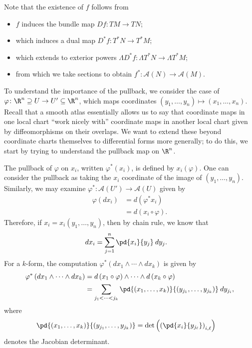 \documentclass[10pt]{mypackage}
\begin{document}
Note that the existence of $f$ follows from
\begin{itemize}
  \item $f$ induces the bundle map $Df\colon TM\rightarrow TN$;
  \item which induces a dual map $D^{\ast}f\colon T^{\ast}N\rightarrow T^{\ast}M$;
  \item which extends to exterior powers $\Lambda D^{\ast}f\colon \Lambda T^{\ast}N\rightarrow \Lambda T^{\ast}M $;
  \item from which we take sections to obtain $f^{\ast}\colon \mathcal{A}\left( N \right)\rightarrow \mathcal{A}\left( M \right)$.
\end{itemize}
To understand the importance of the pullback, we consider the case of $\varphi\colon \R^{n}\supseteq U\rightarrow U'\subseteq \R^{n}$, which maps coordinates $\left( y_1,\dots,y_n \right)\mapsto \left( x_1,\dots,x_n \right)$. Recall that a smooth atlas essentially allows us to say that coordinate maps in one local chart ``work nicely with'' coordinate maps in another local chart given by diffeomorphisms on their overlaps. We want to extend these beyond coordinate charts themselves to differential forms more generally; to do this, we start by trying to understand the pullback map on $\R^{n}$.\newline

The pullback of $\varphi$ on $x_i$, written $\varphi^{\ast}\left( x_i \right)$, is defined by $x_i\left( \varphi \right)$. One can consider the pullback as taking the $x_i$ coordinate of the image of $\left( y_1,\dots,y_n \right)$. Similarly, we may examine $\varphi^{\ast}\colon \mathcal{A}\left( U' \right)\rightarrow \mathcal{A}\left( U \right)$ given by
\begin{align*}
  \varphi\left( dx_i \right) &= d\left( \varphi^{\ast}x_i \right)\\
                             &= d\left( x_i\circ\varphi \right).
\end{align*}
Therefore, if $x_i = x_i\left( y_1,\dots,y_n \right)$, then by chain rule, we know that
\begin{align*}
  dx_i &= \sum_{j=1}^{n} \pd{x_i}{y_j}\:dy_j.
\end{align*}
For a $k$-form, the computation $\varphi^{\ast}\left( dx_1\wedge\cdots\wedge dx_k \right)$ is given by
\begin{align*}
  \varphi^{\ast}\left( dx_1\wedge\cdots\wedge dx_k \right) &= d\left( x_1\circ\varphi \right)\wedge\cdots\wedge d\left( x_k\circ\varphi \right)\\
                                                           &= \sum_{j_1 < \cdots < j_k} \pd{\left( x_1,\dots,x_k \right)}{\left( y_{j_1},\dots,y_{j_k} \right)}\:dy_{j_i},
\end{align*}
where
\begin{align*}
  \pd{\left( x_1,\dots,x_k \right)}{\left( y_{j_1},\dots,y_{j_k} \right)} &= \det \left( \left( \pd{x_i}{y_{j_\ell}} \right)_{i,\ell} \right)
\end{align*}
denotes the Jacobian determinant.\newline
\end{document}
